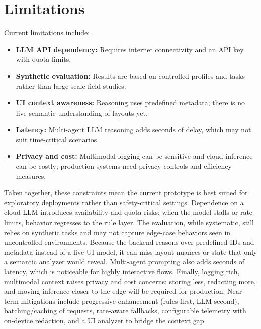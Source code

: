 \documentclass[openany]{book}
\begin{document}
\section{Limitations}
Current limitations include:
\begin{itemize}
    \item \textbf{LLM API dependency:} Requires internet connectivity and an API key with quota limits.
    \item \textbf{Synthetic evaluation:} Results are based on controlled profiles and tasks rather than large-scale field studies.
    \item \textbf{UI context awareness:} Reasoning uses predefined metadata; there is no live semantic understanding of layouts yet.
    \item \textbf{Latency:} Multi-agent LLM reasoning adds seconds of delay, which may not suit time-critical scenarios.
    \item \textbf{Privacy and cost:} Multimodal logging can be sensitive and cloud inference can be costly; production systems need privacy controls and efficiency measures.
\end{itemize}
Taken together, these constraints mean the current prototype is best suited for exploratory deployments rather than safety-critical settings. Dependence on a cloud LLM introduces availability and quota risks; when the model stalls or rate-limits, behavior regresses to the rule layer. The evaluation, while systematic, still relies on synthetic tasks and may not capture edge-case behaviors seen in uncontrolled environments. Because the backend reasons over predefined IDs and metadata instead of a live UI model, it can miss layout nuances or state that only a semantic analyzer would reveal. Multi-agent prompting also adds seconds of latency, which is noticeable for highly interactive flows. Finally, logging rich, multimodal context raises privacy and cost concerns: storing less, redacting more, and moving inference closer to the edge will be required for production. Near-term mitigations include progressive enhancement (rules first, LLM second), batching/caching of requests, rate-aware fallbacks, configurable telemetry with on-device redaction, and a UI analyzer to bridge the context gap.
\end{document}
